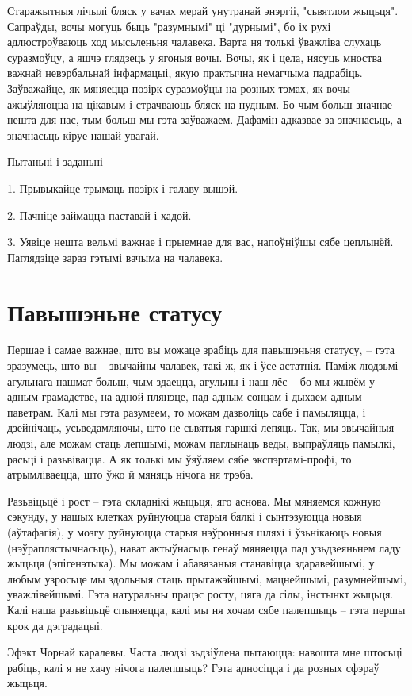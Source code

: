 Старажытныя лічылі бляск у вачах мерай унутранай энэргіі, "сьвятлом жыцьця". Сапраўды, вочы могуць быць "разумнымі" ці "дурнымі", бо іх рухі адлюстроўваюць ход мысьленьня чалавека. Варта ня толькі ўважліва слухаць суразмоўцу, а яшчэ глядзець у ягоныя вочы. Вочы, як і цела, нясуць мноства важнай невэрбальнай інфармацыі, якую практычна немагчыма падрабіць. Заўважайце, як мяняецца позірк суразмоўцы на розных тэмах, як вочы ажыўляюцца на цікавым і страчваюць бляск на нудным. Бо чым больш значнае нешта для нас, тым больш мы гэта заўважаем. Дафамін адказвае за значнасьць, а значнасьць кіруе нашай увагай.

Пытаньні і заданьні

1. Прывыкайце трымаць позірк і галаву вышэй.

2. Пачніце займацца паставай і хадой.

3. Уявіце нешта вельмі важнае і прыемнае для вас, напоўніўшы сябе цеплынёй. Паглядзіце зараз гэтымі вачыма на чалавека.


\section{Павышэньне статусу}

Першае і самае важнае, што вы можаце зрабіць для павышэньня статусу, – гэта зразумець, што вы – звычайны чалавек, такі ж, як і ўсе астатнія. Паміж людзьмі агульнага нашмат больш, чым здаецца, агульны і наш лёс – бо мы жывём у адным грамадстве, на адной плянэце, пад адным сонцам і дыхаем адным паветрам. Калі мы гэта разумеем, то можам дазволіць сабе і памыляцца, і дзейнічаць, усьведамляючы, што не сьвятыя гаршкі лепяць. Так, мы звычайныя людзі, але можам стаць лепшымі, можам паглынаць веды, выпраўляць памылкі, расьці і разьвівацца. А як толькі мы ўяўляем сябе экспэртамі-профі, то атрымліваецца, што ўжо й мяняць нічога ня трэба.

Разьвіцьцё і рост – гэта складнікі жыцьця, яго аснова. Мы мяняемся кожную сэкунду, у нашых клетках руйнуюцца старыя бялкі і сынтэзуюцца новыя (аўтафагія), у мозгу руйнуюцца старыя нэўронныя шляхі і ўзьнікаюць новыя (нэўраплястычнасьць), нават актыўнасьць генаў мяняецца пад узьдзеяньнем ладу жыцьця (эпігенэтыка). Мы можам і абавязаныя станавіцца здаравейшымі, у любым узросьце мы здольныя стаць прыгажэйшымі, мацнейшымі, разумнейшымі, уважлівейшымі. Гэта натуральны працэс росту, цяга да сілы, інстынкт жыцьця. Калі наша разьвіцьцё спыняецца, калі мы ня хочам сябе палепшыць – гэта першы крок да дэградацыі.

Эфэкт Чорнай каралевы. Часта людзі зьдзіўлена пытаюцца: навошта мне штосьці рабіць, калі я не хачу нічога палепшыць? Гэта адносіцца і да розных сфэраў жыцьця. 

